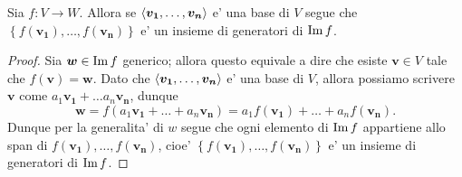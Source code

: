 \begin{proposition}\label{base_mappata_generatori_immagine}
    Sia $f : V \to W$. Allora se $\left\langle \bm{v_1}, \dots, \bm{v_n} \right\rangle$ e' una base di $V$ segue che $\left\{ f(\bm{v_1}), \dots, f(\bm{v_n})\right\}$ e' un insieme di generatori di $\operatorname{Im}f$.
\end{proposition}
\begin{proof}
    Sia $\bm{w} \in \operatorname{Im}f$ generico; allora questo equivale a dire che esiste $\bm{v} \in V$ tale che $f(\bm{v}) = \bm{w}$.
    Dato che $\left\langle \bm{v_1}, \dots, \bm{v_n} \right\rangle$ e' una base di $V$, allora possiamo scrivere $\bm{v}$ come $a_1\bm{v_1} + \dots a_n\bm{v_n}$, dunque 
    \begin{equation*}
        \bm{w} = f(a_1\bm{v_1} + \dots + a_n\bm{v_n}) = a_1f(\bm{v_1}) + \dots + a_nf(\bm{v_n}).
    \end{equation*}
    Dunque per la generalita' di $w$ segue che ogni elemento di $\operatorname{Im}f$ appartiene allo span di $f(\bm{v_1}), \dots, f(\bm{v_n})$, cioe' $\left\{ f(\bm{v_1}), \dots, f(\bm{v_n})\right\}$ e' un insieme di generatori di $\operatorname{Im}f$.
\end{proof}

